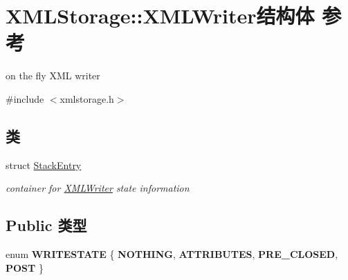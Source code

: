 \hypertarget{struct_x_m_l_storage_1_1_x_m_l_writer}{}\section{X\+M\+L\+Storage\+:\+:X\+M\+L\+Writer结构体 参考}
\label{struct_x_m_l_storage_1_1_x_m_l_writer}


on the fly X\+ML writer  




{\ttfamily \#include $<$xmlstorage.\+h$>$}

\subsection*{类}
\begin{DoxyCompactItemize}
\item 
struct \hyperlink{struct_x_m_l_storage_1_1_x_m_l_writer_1_1_stack_entry}{Stack\+Entry}
\begin{DoxyCompactList}\small\item\em container for \hyperlink{struct_x_m_l_storage_1_1_x_m_l_writer}{X\+M\+L\+Writer} state information \end{DoxyCompactList}\end{DoxyCompactItemize}
\subsection*{Public 类型}
\begin{DoxyCompactItemize}
\item 
\mbox{\label{struct_x_m_l_storage_1_1_x_m_l_writer_a32aa9b48b973cc98b20e7972c3c9e3bf}} 
enum {\bfseries W\+R\+I\+T\+E\+S\+T\+A\+TE} \{ {\bfseries N\+O\+T\+H\+I\+NG}, 
{\bfseries A\+T\+T\+R\+I\+B\+U\+T\+ES}, 
{\bfseries P\+R\+E\+\_\+\+C\+L\+O\+S\+ED}, 
{\bfseries P\+O\+ST}
 \}
\end{DoxyCompactItemize}
